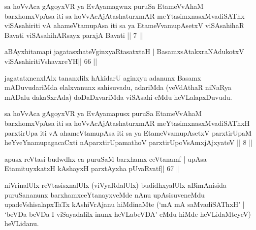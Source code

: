 
\begin{kandikeshl}
sa hoVvAca gAgoyxVR ya EvAyamagwnx puruSa EtameVvAhaM barxhomxVpAsa iti sa hoVvAcAjAtashaturxmAR meYtasimxnasxMvadiSAThx viSAsahiriti vA ahameVtamupAsa iti sa ya EtameVvamupAsetxV viSAsahihaR Bavati viSAsahihARsayx parxjA Bavati || 7 ||
\end{kandikeshl}


\begin{shl}
aBAyxhitamapi jagatasxhateV\s ginxyaRtasatxtaH |
BasamxsAtakxraNAdukotxV viSAsahiritiVshavxreYH\hfill || 66 ||
\end{shl}

\begin{artha}
jagatatxnenxlAlx tananxlilx hAkidarU aginxyu adanunx Basamx mADuvudariMda elalxvanunx sahisuvadu, adariMda (veVdAthaR niNaRya mADalu dakaSxrAda) doDaDxvariMda viSAsahi eMdu heVLalapxDuvudu.
\end{artha}


\begin{kandikeshl}
sa hoVvAca gAgoyxVR ya EvAyamapusx puruSa EtameVvAhaM barxhomxVpAsa iti sa hoVvAcAjAtashaturxmAR meYtasimxnasxMvadiSAThxH parxtirUpa iti vA ahameVtamupAsa iti sa ya EtameVvamupAsetxV parxtirUpaM heYveYnamupagacaCxti nAparxtirUpamathoV parxtirUpoV\s sAmxjAjxyateV || 8 ||
\end{kandikeshl}


\begin{shl}
apusx reVtasi budwdhx ca puruSaM barxhamx ceVtanamf |
upAsa EtamituyxkatxH kAshayxH parxtAyxha pUvaRvatf\hfill || 67 ||
\end{shl}

\begin{artha}
niVrinalUlx reVtasisxnalUlx (viVyaRdalUlx) budidhxyalUlx aBimAnisida  puruSananunx barxhamxceYtanayxveMde nAnu upAsisuveneMdu  upadeVshisalapxTaTx kAshiVrAjanu hiMdinaMte (`mA mA saMvadiSAThxH' | `beVDa beVDa I viSayadalilx inunx heVLabeVDA' eMdu hiMde heVLidaMteyeV) heVLidanu.
\end{artha}


